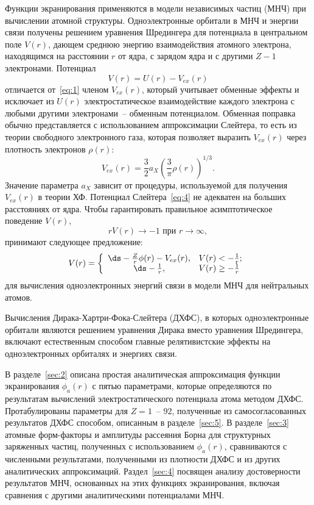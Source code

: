 \documentclass[10pt,pscyr]{hedlab}
\newcommand{\eq}  [1]{\eqref{eq:#1}}
\newcommand{\sect}[1]{\ref{sec:#1}}
\begin{document}
  Функции экранирования применяются в модели независимых частиц (МНЧ) при
  вычислении атомной структуры. Одноэлектронные орбитали в МНЧ и энергии связи
  получены решением уравнения Шредингера для потенциала в центральном поле
  \( V(r) \), дающем среднюю энергию взаимодействия атомного электрона,
  находящимся на расстоянии \( r \) от ядра, с зарядом ядра и с другими
  \( Z - 1 \) электронами. Потенциал
  \[
  V(r) = U(r) - V_{ex}(r)
  \]
  отличается от~\eq{1} членом \( V_{ex}(r) \), который учитывает
  обменные эффекты и исключает из \( U(r) \) электростатическое
  взаимодействие каждого электрона с любыми другими электронами~-- обменным
  потенциалом. Обменная поправка обычно представляется с использованием
  аппроксимации Слейтера, то есть из теории свободного электронного газа,
  которая позволяет выразить \( V_{ex}(r) \) через плотность электронов
  \( \rho(r) \):
  \begin{equation}
  V_{ex}(r) = \frac{3}{2}a_X \left(\frac{3}{\pi}\rho(r)\right)^{1/3}.
  \label{eq:4}
  \end{equation}
  Значение параметра \( a_X \) зависит от процедуры, используемой для получения
  \( V_{ex}(r) \) в теории ХФ. Потенциал Слейтера~\eq{4} не адекватен на
  больших расстояниях от ядра. Чтобы гарантировать правильное асимптотическое
  поведение \( V(r) \),
  \[
  rV(r) \to -1 \text{ при } r \to \infty,
  \]
  принимают следующее предложение:
  \begin{equation}
  V(r) = \left\{
  \begin{array}{cl}
  \ds -\frac{Z}{r}\phi(r) - V_{ex}(r), & V(r) < -\frac{1}{r}; \\
  \ds -\frac{1}{r}, & V(r) \ge -\frac{1}{r}
  \end{array}
  \right.
  \label{eq:6}
  \end{equation}
  для вычисления одноэлектронных энергий связи в модели МНЧ для нейтральных
  атомов.
  
  Вычисления Дирака-Хартри-Фока-Слейтера (ДХФС), в которых одноэлектронные
  орбитали являются решением уравнения Дирака вместо уравнения Шредингера,
  включают естественным способом главные релятивистские эффекты на
  одноэлектронных орбиталях и энергиях связи.
  
  В разделе~\sect{2} описана простая аналитическая аппроксимация функции
  экранирования \( \phi_a(r) \) с пятью параметрами, которые определяются по
  результатам вычислений электростатического потенциала атома методом ДХФС.
  Протабулированы параметры для \( Z = 1 \)~-- \( 92 \), полученные из
  самосогласованных результатов ДХФС способом, описанным в разделе~\sect{5}.
  В разделе~\sect{3} атомные форм-факторы и амплитуды рассеяния Борна для
  структурных заряженных частиц, полученных с использованием \( \phi_a(r) \),
  сравниваются с численными результатами, полученными из плотности ДХФС и
  из других аналитических аппроксимаций. Раздел~\sect{4} посвящен анализу
  достоверности результатов МНЧ, основанных на этих функциях экранирования,
  включая сравнения с другими аналитическими потенциалами МНЧ.
  
\end{document}
